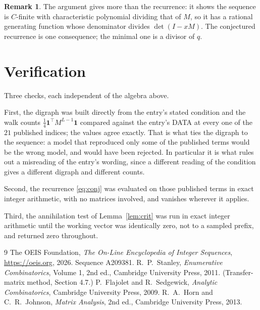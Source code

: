 \documentclass[11pt,a4paper]{article}
\theoremstyle{plain}
\theoremstyle{definition}
\newtheorem{remark}[theorem]{Remark}
\begin{document}
\begin{remark}
The argument gives more than the recurrence: it shows the sequence is $C$-finite with
characteristic polynomial dividing that of $M$, so it has a rational generating function
whose denominator divides $\det(I-xM)$. The conjectured recurrence is one consequence; the
minimal one is a divisor of $q$.
\end{remark}

\section{Verification}

Three checks, each independent of the algebra above.

First, the digraph was built directly from the entry's stated condition and the walk counts
$\tfrac1{4}\mathbf{1}^{\!\top}M^{L-1}\mathbf{1}$ compared against the entry's DATA at
every one of the $21$ published indices; the values agree exactly. That is what ties
the digraph to the sequence: a model that reproduced only some of the published terms would
be the wrong model, and would have been rejected. In particular it is what rules out a
misreading of the entry's wording, since a different reading of the condition gives a
different digraph and different counts.

Second, the recurrence \eqref{eq:conj} was evaluated on those published terms in exact
integer arithmetic, with no matrices involved, and vanishes wherever it applies.

Third, the annihilation test of Lemma~\ref{lem:crit} was run in exact integer arithmetic
until the working vector was identically zero, not to a sampled prefix, and returned zero
throughout.

\begin{thebibliography}{9}
 The OEIS Foundation, \emph{The On-Line Encyclopedia of Integer
Sequences}, \url{https://oeis.org}, 2026. Sequence A209381.
 R.~P.~Stanley, \emph{Enumerative Combinatorics}, Volume 1, 2nd ed.,
Cambridge University Press, 2011. (Transfer-matrix method, Section 4.7.)
 P.~Flajolet and R.~Sedgewick, \emph{Analytic Combinatorics}, Cambridge
University Press, 2009.
 R.~A.~Horn and C.~R.~Johnson, \emph{Matrix Analysis}, 2nd ed., Cambridge
University Press, 2013.
\end{thebibliography}
\end{document}
